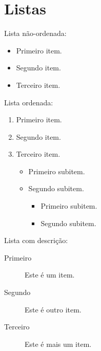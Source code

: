 \documentclass{article}
\begin{document}
	
	\section{Listas}
	
	Lista não-ordenada:
	\begin{itemize}
		\item Primeiro item.
		\item Segundo item.
		\item Terceiro item.
	\end{itemize}


	Lista ordenada:
	\begin{enumerate}
		\item Primeiro item.
		\item Segundo item.
		\item Terceiro item.
		\begin{itemize}
			\item Primeiro subitem.
			\item Segundo subitem.
			\begin{itemize}
				\item Primeiro subitem.
				\item Segundo subitem.
			\end{itemize}
		\end{itemize}
	\end{enumerate}

	Lista com descrição:
	\begin{description}
		\item[Primeiro] Este é um item.
		\item[Segundo] Este é outro item.
		\item[Terceiro] Este é mais um item.
	\end{description}
	
\end{document}
